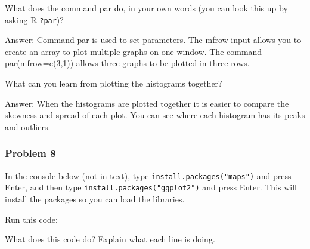 \documentclass[
]{article}
\newenvironment{Shaded}{\begin{snugshade}}{\end{snugshade}}
\newcommand{\AttributeTok}[1]{\textcolor[rgb]{0.77,0.63,0.00}{#1}}
\newcommand{\FunctionTok}[1]{\textcolor[rgb]{0.00,0.00,0.00}{#1}}
\newcommand{\NormalTok}[1]{#1}
\newcommand{\SpecialCharTok}[1]{\textcolor[rgb]{0.00,0.00,0.00}{#1}}
\newcommand{\StringTok}[1]{\textcolor[rgb]{0.31,0.60,0.02}{#1}}
\begin{document}
What does the command par do, in your own words (you can look this up by
asking R \texttt{?par})?

Answer: Command par is used to set parameters. The mfrow input allows
you to create an array to plot multiple graphs on one window. The
command par(mfrow=c(3,1)) allows three graphs to be plotted in three
rows.

What can you learn from plotting the histograms together?

Answer: When the histograms are plotted together it is easier to compare
the skewness and spread of each plot. You can see where each histogram
has its peaks and outliers.

\hypertarget{problem-8}{%
\subsubsection{Problem 8}\label{problem-8}}

In the console below (not in text), type
\texttt{install.packages("maps")} and press Enter, and then type
\texttt{install.packages("ggplot2")} and press Enter. This will install
the packages so you can load the libraries.

Run this code:

\begin{Shaded}
\end{Shaded}

What does this code do? Explain what each line is doing.
\end{document}
